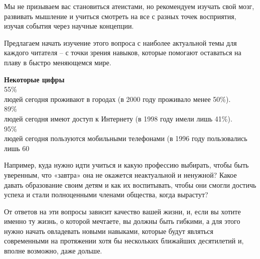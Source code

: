 Мы не призываем вас становиться атеистами, но рекомендуем изучать свой мозг, развивать мышление и учиться смотреть на все с разных точек восприятия, изучая события через научные концепции.

Предлагаем начать изучение этого вопроса с наиболее актуальной темы для каждого читателя – с точки зрения навыков, которые помогают оставаться на плаву в быстро меняющемся мире.

\begin{fancyquotes}
    \textbf{Некоторые цифры}\\

    {\Huge 55\%}\\
    людей сегодня проживают в городах (в 2000 году проживало менее 50\%).\\[1em]

    {\Huge 89\%}\\
    людей сегодня имеют доступ к Интернету (в 1998 году имели лишь 41\%).\\[1em]

    {\Huge 95\%}\\
    людей сегодня пользуются мобильными телефонами (в 1996 году пользовались лишь 60%

\end{fancyquotes}

Например, куда нужно идти учиться и какую профессию выбирать, чтобы быть уверенным, что «завтра» она не окажется неактуальной и ненужной? Какое давать образование своим детям и как их воспитывать, чтобы они смогли достичь успеха и стали полноценными членами общества, когда вырастут?

От ответов на эти вопросы зависит качество вашей жизни, и, если вы хотите именно ту жизнь, о которой мечтаете, вы должны быть гибкими, а для этого нужно начать овладевать новыми навыками, которые будут являться современными на протяжении хотя бы нескольких ближайших десятилетий и, вполне возможно, даже дольше.


